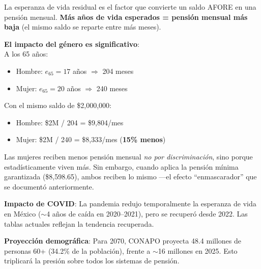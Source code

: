 \documentclass[11pt,a4paper]{report}
\begin{document}
\begin{tcolorbox}[colback=green!5!white, colframe=green!50!black, title=\textbf{Intuici\'on}]
La esperanza de vida residual es el factor que convierte un saldo AFORE en una pensi\'on mensual. \textbf{M\'as a\~nos de vida esperados = pensi\'on mensual m\'as baja} (el mismo saldo se reparte entre m\'as meses).

\textbf{El impacto del g\'enero es significativo}:\\
A los 65 a\~nos:
\begin{itemize}[nosep]
\item Hombre: $e_{65} = 17$ a\~nos $\Rightarrow$ 204 meses
\item Mujer: $e_{65} = 20$ a\~nos $\Rightarrow$ 240 meses
\end{itemize}

Con el mismo saldo de \$2,000,000:
\begin{itemize}[nosep]
\item Hombre: \$2M / 204 = \$9,804/mes
\item Mujer: \$2M / 240 = \$8,333/mes (\textbf{15\% menos})
\end{itemize}

Las mujeres reciben menos pensi\'on mensual \emph{no por discriminaci\'on}, sino porque estad\'isticamente viven m\'as. Sin embargo, cuando aplica la pensi\'on m\'inima garantizada (\$8,598.65), ambos reciben lo mismo ---el efecto ``enmascarador'' que se document\'o anteriormente.

\textbf{Impacto de COVID}: La pandemia redujo temporalmente la esperanza de vida en M\'exico ($\sim$4 a\~nos de ca\'ida en 2020--2021), pero se recuper\'o desde 2022. Las tablas actuales reflejan la tendencia recuperada.

\textbf{Proyecci\'on demogr\'afica}: Para 2070, CONAPO proyecta 48.4 millones de personas 60+ (34.2\% de la poblaci\'on), frente a $\sim$16 millones en 2025. Esto triplicar\'a la presi\'on sobre todos los sistemas de pensi\'on.
\end{tcolorbox}
\end{document}
